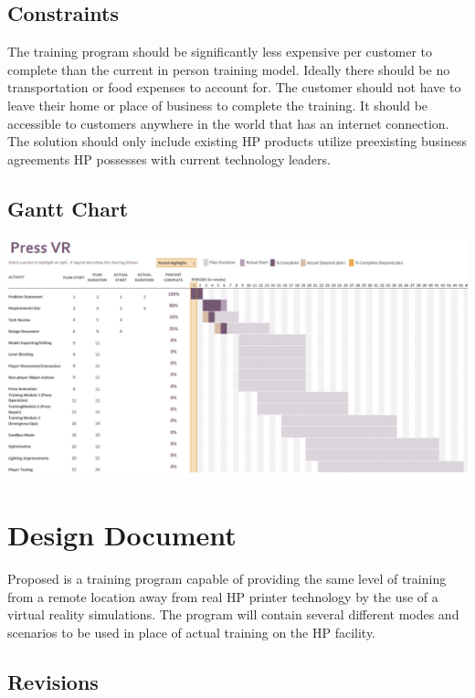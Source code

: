 \documentclass[onecolumn, draftclsnofoot,10pt, compsoc]{IEEEtran}
\begin{document}
\subsection{Constraints}
The training program should be significantly less expensive per customer to complete than the current in person training model. Ideally there should be no transportation or food expenses to account for. The customer should not have to leave their home or place of business to complete the training. It should be accessible to customers anywhere in the world that has an internet connection. The solution should only include existing HP products utilize preexisting business agreements HP possesses with current technology leaders. 

\subsection{Gantt Chart}
\bigskip
\includegraphics[scale=.75]{ganttChart.PNG}


\newpage
\section{Design Document}
        Proposed is a training program capable of providing the same level of training from a remote location away from real HP printer technology by the use of a virtual reality simulations. The program will contain several different modes and scenarios to be used in place of actual training on the HP facility.
\newpage

\subsection*{Revisions}
\end{document}
